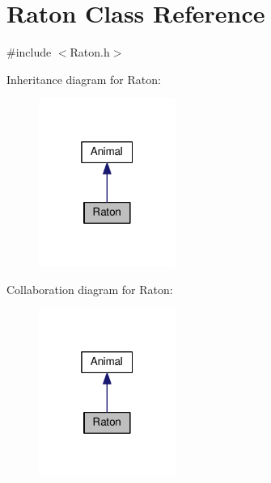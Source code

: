 \hypertarget{classRaton}{}\section{Raton Class Reference}
\label{classRaton}


{\ttfamily \#include $<$Raton.\+h$>$}



Inheritance diagram for Raton\+:
\nopagebreak
\begin{figure}[H]
\begin{center}
\leavevmode
\includegraphics[width=127pt]{classRaton__inherit__graph}
\end{center}
\end{figure}


Collaboration diagram for Raton\+:
\nopagebreak
\begin{figure}[H]
\begin{center}
\leavevmode
\includegraphics[width=127pt]{classRaton__coll__graph}
\end{center}
\end{figure}
